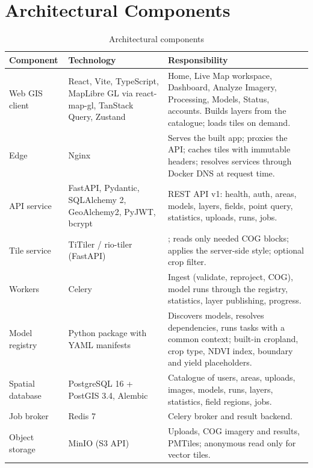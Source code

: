 \section{Architectural Components}
\begin{table}[htbp]
\centering\small
\caption{Architectural components}
\label{tab:components}
\begin{tabularx}{\textwidth}{L{3.0cm} L{3.4cm} Y}
\toprule
\textbf{Component} & \textbf{Technology} & \textbf{Responsibility}\\
\midrule
Web GIS client & React, Vite, TypeScript, MapLibre GL via react-map-gl, TanStack Query, Zustand & Home, Live Map workspace, Dashboard, Analyze Imagery, Processing, Models, Status, accounts. Builds layers from the catalogue; loads tiles on demand.\\
Edge & Nginx & Serves the built app; proxies the API; caches tiles with immutable headers; resolves services through Docker DNS at request time.\\
API service & FastAPI, Pydantic, SQLAlchemy 2, GeoAlchemy2, PyJWT, bcrypt & REST API v1: health, auth, areas, models, layers, fields, point query, statistics, uploads, runs, jobs.\\
Tile service & TiTiler / rio-tiler (FastAPI) & ; reads only needed COG blocks; applies the server-side style; optional crop filter.\\
Workers & Celery & Ingest (validate, reproject, COG), model runs through the registry, statistics, layer publishing, progress.\\
Model registry & Python package with YAML manifests & Discovers models, resolves dependencies, runs tasks with a common context; built-in cropland, crop type, NDVI index, boundary and yield placeholders.\\
Spatial database & PostgreSQL 16 + PostGIS 3.4, Alembic & Catalogue of users, areas, uploads, images, models, runs, layers, statistics, field regions, jobs.\\
Job broker & Redis 7 & Celery broker and result backend.\\
Object storage & MinIO (S3 API) & Uploads, COG imagery and results, PMTiles; anonymous read only for vector tiles.\\
\bottomrule
\end{tabularx}
\end{table}

